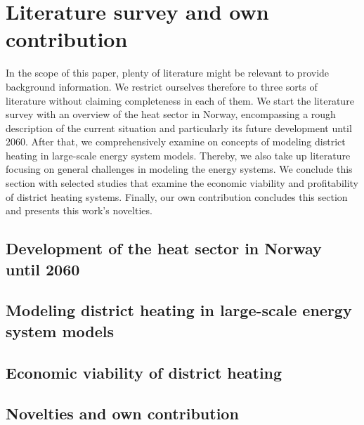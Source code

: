\section{Literature survey and own contribution}\label{stateoftheart}
In the scope of this paper, plenty of literature might be relevant to provide background information. We restrict ourselves therefore to three sorts of literature without claiming completeness in each of them. We start the literature survey with an overview of the heat sector in Norway, encompassing a rough description of the current situation and particularly its future development until 2060. After that, we comprehensively examine on concepts of modeling district heating in large-scale energy system models. Thereby, we also take up literature focusing on general challenges in modeling the energy systems. We conclude this section with selected studies that examine the economic viability and profitability of district heating systems. Finally, our own contribution concludes this section and presents this work's novelties. 

\subsection{Development of the heat sector in Norway until 2060}
\cite{rosenberg2013future}
\subsection{Modeling district heating in large-scale energy system models}
\subsection{Economic viability of district heating}
\subsection{Novelties and own contribution}


